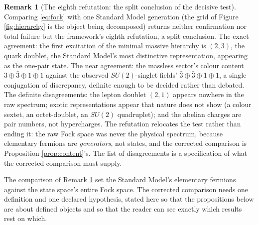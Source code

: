 \documentclass[11pt]{article}
\theoremstyle{definition}
\newtheorem{remark}[theorem]{Remark}
\begin{document}
\begin{remark}[The eighth refutation: the split conclusion of the decisive test]\label{rem:eighth}
Comparing \eqref{eq:fock} with one Standard Model generation (the grid of Figure \ref{fig:hierarchy} is the object being decomposed) returns neither confirmation nor total failure but the framework's eighth refutation, a split conclusion. The exact agreement: the first excitation of the minimal massive hierarchy is $(2,3)$, the quark doublet, the Standard Model's most distinctive representation, appearing as the one-pair state. The near agreement: the massless sector's colour content $3 \oplus \bar{3} \oplus 1 \oplus 1$ against the observed $SU(2)$-singlet fields' $\bar{3} \oplus \bar{3} \oplus 1 \oplus 1$, a single conjugation of discrepancy, definite enough to be decided rather than debated. The definite disagreements: the lepton doublet $(2,1)$ appears nowhere in the raw spectrum; exotic representations appear that nature does not show (a colour sextet, an octet-doublet, an $SU(2)$ quadruplet); and the abelian charges are pair numbers, not hypercharges. The refutation relocates the test rather than ending it: the raw Fock space was never the physical spectrum, because elementary fermions are \emph{generators}, not states, and the corrected comparison is Proposition \ref{prop:content}'s. The list of disagreements is a specification of what the corrected comparison must supply.
\end{remark}

The comparison of Remark \ref{rem:eighth} set the Standard Model's elementary fermions against the state space's entire Fock space. The corrected comparison needs one definition and one declared hypothesis, stated here so that the propositions below are about defined objects and so that the reader can see exactly which results rest on which.
\end{document}
